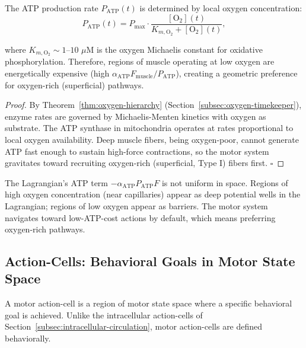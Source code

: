 \begin{theorem}
\label{thm:atp-oxygen-coupling}
The ATP production rate $P_{\text{ATP}}(t)$ is determined by local oxygen concentration:
\begin{equation}
  P_{\text{ATP}}(t) = P_{\text{max}} \cdot \frac{[\text{O}_2](t)}{K_{m,\text{O}_2} + [\text{O}_2](t)},
\end{equation}

where $K_{m,\text{O}_2} \sim 1$--$10$ $\mu$M is the oxygen Michaelis constant for oxidative phosphorylation. Therefore, regions of muscle operating at low oxygen are energetically expensive (high $\alpha_{\text{ATP}} F_{\text{muscle}} / P_{\text{ATP}}$), creating a geometric preference for oxygen-rich (superficial) pathways.
\end{theorem}

\begin{proof}
By Theorem~\ref{thm:oxygen-hierarchy} (Section~\ref{subsec:oxygen-timekeeper}), enzyme rates are governed by Michaelis-Menten kinetics with oxygen as substrate. The ATP synthase in mitochondria operates at rates proportional to local oxygen availability. Deep muscle fibers, being oxygen-poor, cannot generate ATP fast enough to sustain high-force contractions, so the motor system gravitates toward recruiting oxygen-rich (superficial, Type I) fibers first. $\square$
\end{proof}

\begin{corollary}
The Lagrangian's ATP term $-\alpha_{\text{ATP}} P_{\text{ATP}} F$ is not uniform in space. Regions of high oxygen concentration (near capillaries) appear as deep potential wells in the Lagrangian; regions of low oxygen appear as barriers. The motor system navigates toward low-ATP-cost actions by default, which means preferring oxygen-rich pathways.
\end{corollary}

\subsection{Action-Cells: Behavioral Goals in Motor State Space}
\label{subsec:action-cells-motor}

A motor action-cell is a region of motor state space where a specific behavioral goal is achieved. Unlike the intracellular action-cells of Section~\ref{subsec:intracellular-circulation}, motor action-cells are defined behaviorally.

